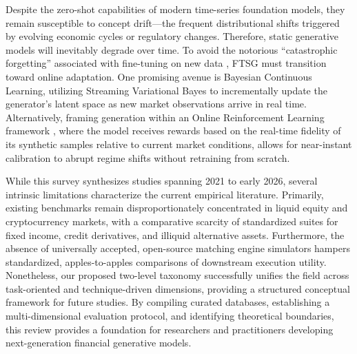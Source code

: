 Despite the zero-shot capabilities of modern time-series foundation models, they remain susceptible to concept drift---the frequent distributional shifts triggered by evolving economic cycles or regulatory changes. Therefore, static generative models will inevitably degrade over time. To avoid the notorious ``catastrophic forgetting'' associated with fine-tuning on new data \cite{mccloskey1989catastrophic, zenke2017continual}, FTSG must transition toward online adaptation.
One promising avenue is Bayesian Continuous Learning, utilizing Streaming Variational Bayes \cite{nguyen2017variational} to incrementally update the generator's latent space as new market observations arrive in real time. Alternatively, framing generation within an Online Reinforcement Learning framework \cite{moody2001learning}, where the model receives rewards based on the real-time fidelity of its synthetic samples relative to current market conditions, allows for near-instant calibration to abrupt regime shifts without retraining from scratch.

While this survey synthesizes studies spanning 2021 to early 2026, several intrinsic limitations characterize the current empirical literature. Primarily, existing benchmarks remain disproportionately concentrated in liquid equity and cryptocurrency markets, with a comparative scarcity of standardized suites for fixed income, credit derivatives, and illiquid alternative assets. Furthermore, the absence of universally accepted, open-source matching engine simulators hampers standardized, apples-to-apples comparisons of downstream execution utility. 
Nonetheless, our proposed two-level taxonomy successfully unifies the field across task-oriented and technique-driven dimensions, providing a structured conceptual framework for future studies. By compiling curated databases, establishing a multi-dimensional evaluation protocol, and identifying theoretical boundaries, this review provides a foundation for researchers and practitioners developing next-generation financial generative models.